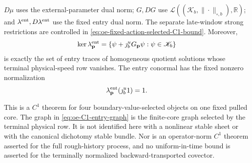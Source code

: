 \begin{theorem}
\(D\mu\) uses the external-parameter dual norm;
\(G,DG\) use
\(\mathcal L((\mathscr K_b,\|\cdot\|_{\circ,b}),\mathbb R)\); and
\(\lambda^{\rm ent},D\lambda^{\rm ent}\) use the fixed entry dual norm.
The separate late-window strong restrictions are controlled in
\cref{eq:oe-fixed-action-selected-C1-bound}.
Moreover,
\begin{equation}
 \ker\lambda_{\mathbf p}^{\rm ent}
 =\{\psi+\jmath_b^uG_{\mathbf p}\psi:
               \psi\in\mathscr K_b\}           \label{eq:oe-C1-entry-graph}
\end{equation}
is exactly the set of entry traces of homogeneous quotient solutions
whose terminal physical-speed row vanishes.
The entry conormal has the fixed nonzero normalization
\begin{equation}
 \lambda_{\mathbf p}^{\rm ent}(\jmath_b^u1)=1. \label{eq:oe-C1-entry-conormal-normalization}
\end{equation}

This is a \(C^1\) theorem for four boundary-value-selected objects on
one fixed pulled core.  The graph in
\cref{eq:oe-C1-entry-graph} is the finite-core graph selected by the
terminal physical row.  It is not identified here with a nonlinear
stable sheet or with the canonical dichotomy stable bundle.  Nor is an
operator-norm \(C^1\) theorem asserted for the full rough-history
process, and no uniform-in-time bound is asserted for the terminally
normalized backward-transported covector.
\end{theorem}

